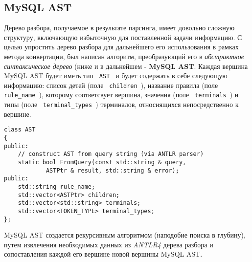 \subsection{MySQL AST}
Дерево разбора, получаемое в результате парсинга, имеет довольно сложную структуру, включающую избыточную для поставленной задачи информацию. С целью упростить дерево разбора для дальнейшего его использования в рамках метода конвертации, был написан алгоритм, преобразующий его в \textit{абстрактное синтаксическое дерево} (ниже и в дальнейшем - \textbf{MySQL AST}. Каждая вершина MySQL AST будет иметь тип \texttt{ AST } и будет содержать в себе следующую информацию: список детей (поле \texttt{ children }), название правила (поле \texttt{ rule_name }), которому соответсвует вершина, значения (поле \texttt{ terminals }) и типы (поле \texttt{  terminal_types }) терминалов, относиящихся непосредственно к вершине. 

\begin{code}
    \label{mysql:AST_cpp}
    \begin{verbatim}
class AST
{
public:
    // construct AST from query string (via ANTLR parser)
    static bool FromQuery(const std::string & query,
            ASTPtr & result, std::string & error);
public:
    std::string rule_name;
    std::vector<ASTPtr> children;
    std::vector<std::string> terminals;
    std::vector<TOKEN_TYPE> terminal_types;
};
    \end{verbatim}
\end{code}

MySQL AST создается рекурсивным алгоритмом (наподобие поиска в глубину), путем извлечения необходимых данных из \textit{ANTLR4} дерева разбора и сопоставления каждой его вершине новой вершины MySQL AST.

\pagebreak
